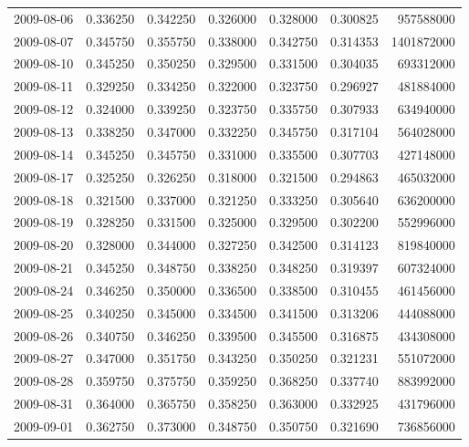 \begin{tabular}{lrrrrrr}
2009-08-06 &    0.336250 &    0.342250 &    0.326000 &    0.328000 &    0.300825 &   957588000 \\
2009-08-07 &    0.345750 &    0.355750 &    0.338000 &    0.342750 &    0.314353 &  1401872000 \\
2009-08-10 &    0.345250 &    0.350250 &    0.329500 &    0.331500 &    0.304035 &   693312000 \\
2009-08-11 &    0.329250 &    0.334250 &    0.322000 &    0.323750 &    0.296927 &   481884000 \\
2009-08-12 &    0.324000 &    0.339250 &    0.323750 &    0.335750 &    0.307933 &   634940000 \\
2009-08-13 &    0.338250 &    0.347000 &    0.332250 &    0.345750 &    0.317104 &   564028000 \\
2009-08-14 &    0.345250 &    0.345750 &    0.331000 &    0.335500 &    0.307703 &   427148000 \\
2009-08-17 &    0.325250 &    0.326250 &    0.318000 &    0.321500 &    0.294863 &   465032000 \\
2009-08-18 &    0.321500 &    0.337000 &    0.321250 &    0.333250 &    0.305640 &   636200000 \\
2009-08-19 &    0.328250 &    0.331500 &    0.325000 &    0.329500 &    0.302200 &   552996000 \\
2009-08-20 &    0.328000 &    0.344000 &    0.327250 &    0.342500 &    0.314123 &   819840000 \\
2009-08-21 &    0.345250 &    0.348750 &    0.338250 &    0.348250 &    0.319397 &   607324000 \\
2009-08-24 &    0.346250 &    0.350000 &    0.336500 &    0.338500 &    0.310455 &   461456000 \\
2009-08-25 &    0.340250 &    0.345000 &    0.334500 &    0.341500 &    0.313206 &   444088000 \\
2009-08-26 &    0.340750 &    0.346250 &    0.339500 &    0.345500 &    0.316875 &   434308000 \\
2009-08-27 &    0.347000 &    0.351750 &    0.343250 &    0.350250 &    0.321231 &   551072000 \\
2009-08-28 &    0.359750 &    0.375750 &    0.359250 &    0.368250 &    0.337740 &   883992000 \\
2009-08-31 &    0.364000 &    0.365750 &    0.358250 &    0.363000 &    0.332925 &   431796000 \\
2009-09-01 &    0.362750 &    0.373000 &    0.348750 &    0.350750 &    0.321690 &   736856000 \\

\end{tabular}
